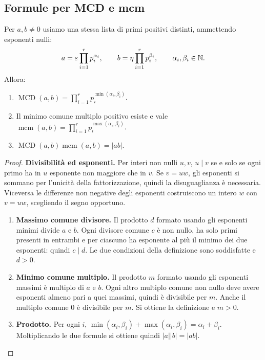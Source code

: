 \subsection{Formule per MCD e mcm}
\begin{proposizione}\label{prop:mcd-mcm}
Per $a,b\ne0$ usiamo una stessa lista di primi positivi distinti, ammettendo esponenti nulli:
\[
a=\varepsilon\prod_{i=1}^r p_i^{\alpha_i},\qquad
b=\eta\prod_{i=1}^r p_i^{\beta_i},\qquad \alpha_i,\beta_i\in\mathbb{N}.
\]
Allora:
\begin{enumerate}[label=\arabic*.]
\item $\displaystyle\operatorname{MCD}(a,b)=\prod_{i=1}^r p_i^{\min(\alpha_i,\beta_i)}$.
\item Il minimo comune multiplo positivo esiste e vale $\displaystyle\operatorname{mcm}(a,b)=\prod_{i=1}^r p_i^{\max(\alpha_i,\beta_i)}$.
\item $\operatorname{MCD}(a,b)\operatorname{mcm}(a,b)=|ab|$.
\end{enumerate}
\end{proposizione}
\begin{proof}
\textbf{Divisibilità ed esponenti.} Per interi non nulli $u,v$, $u\mid v$ se e solo se ogni primo ha in $u$ esponente non maggiore che in $v$. Se $v=uw$, gli esponenti si sommano per l'unicità della fattorizzazione, quindi la disuguaglianza è necessaria. Viceversa le differenze non negative degli esponenti costruiscono un intero $w$ con $v=uw$, scegliendo il segno opportuno.

\begin{enumerate}[label=\arabic*.]
\item \textbf{Massimo comune divisore.} Il prodotto $d$ formato usando gli esponenti minimi divide $a$ e $b$. Ogni divisore comune $c$ è non nullo, ha solo primi presenti in entrambi e per ciascuno ha esponente al più il minimo dei due esponenti: quindi $c\mid d$. Le due condizioni della definizione sono soddisfatte e $d>0$.
\item \textbf{Minimo comune multiplo.} Il prodotto $m$ formato usando gli esponenti massimi è multiplo di $a$ e $b$. Ogni altro multiplo comune non nullo deve avere esponenti almeno pari a quei massimi, quindi è divisibile per $m$. Anche il multiplo comune $0$ è divisibile per $m$. Si ottiene la definizione e $m>0$.
\item \textbf{Prodotto.} Per ogni $i$, $\min(\alpha_i,\beta_i)+\max(\alpha_i,\beta_i)=\alpha_i+\beta_i$. Moltiplicando le due formule si ottiene quindi $|a||b|=|ab|$.
\end{enumerate}
\end{proof}

